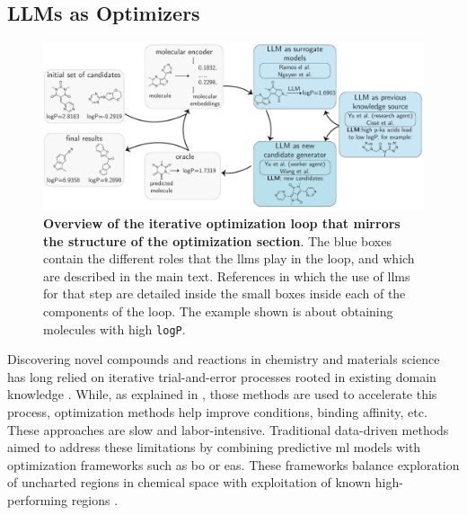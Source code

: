 \subsection{LLMs as Optimizers} \label{sec:llm-optimizers}

\begin{figure}[htb]
    \centering
    \includegraphics[width=1\textwidth]{figures/rescaled_figures/chemrev_figure22.pdf}
    \caption{\textbf{Overview of the iterative optimization loop that mirrors the structure of the optimization section}. The blue boxes contain the different roles that the \glspl{llm} play in the loop, and which are described in the main text. References in which the use of \glspl{llm} for that step are detailed inside the small boxes inside each of the components of the loop. The example shown is about obtaining molecules with high \texttt{logP}.}
    \label{fig:optimization}
\end{figure}

Discovering novel compounds and reactions in chemistry and materials science has long relied on iterative trial-and-error processes rooted in existing domain knowledge \autocite{Taylor2023brief}. While, as explained in , those methods are used to accelerate this process, optimization methods help improve conditions, binding affinity, etc.
These approaches are slow and labor-intensive. 
Traditional data-driven methods aimed to address these limitations by combining predictive \gls{ml} models with optimization frameworks such as \gls{bo} or \glspl{ea}. 
These frameworks balance exploration of uncharted regions in chemical space with exploitation of known high-performing regions \autocite{Li2024sequential, Hse2021gryffin, Shields2021bayesian, Griffiths2020constrained, RajabiKochi2025adaptive}.

